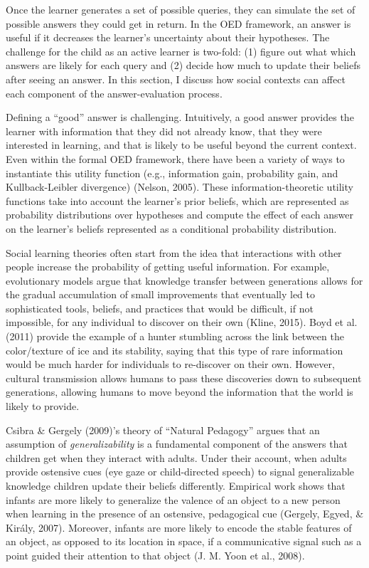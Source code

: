 \documentclass[oneside]{report}
\begin{document}
Once the learner generates a set of possible queries, they can simulate
the set of possible answers they could get in return. In the OED
framework, an answer is useful if it decreases the learner's uncertainty
about their hypotheses. The challenge for the child as an active learner
is two-fold: (1) figure out what which answers are likely for each query
and (2) decide how much to update their beliefs after seeing an answer.
In this section, I discuss how social contexts can affect each component
of the answer-evaluation process.

Defining a ``good'' answer is challenging. Intuitively, a good answer
provides the learner with information that they did not already know,
that they were interested in learning, and that is likely to be useful
beyond the current context. Even within the formal OED framework, there
have been a variety of ways to instantiate this utility function (e.g.,
information gain, probability gain, and Kullback-Leibler divergence)
(Nelson, 2005). These information-theoretic utility functions take into
account the learner's prior beliefs, which are represented as
probability distributions over hypotheses and compute the effect of each
answer on the learner's beliefs represented as a conditional probability
distribution.

Social learning theories often start from the idea that interactions
with other people increase the probability of getting useful
information. For example, evolutionary models argue that knowledge
transfer between generations allows for the gradual accumulation of
small improvements that eventually led to sophisticated tools, beliefs,
and practices that would be difficult, if not impossible, for any
individual to discover on their own (Kline, 2015). Boyd et al. (2011)
provide the example of a hunter stumbling across the link between the
color/texture of ice and its stability, saying that this type of rare
information would be much harder for individuals to re-discover on their
own. However, cultural transmission allows humans to pass these
discoveries down to subsequent generations, allowing humans to move
beyond the information that the world is likely to provide.

Csibra \& Gergely (2009)'s theory of ``Natural Pedagogy'' argues that an
assumption of \emph{generalizability} is a fundamental component of the
answers that children get when they interact with adults. Under their
account, when adults provide ostensive cues (eye gaze or child-directed
speech) to signal generalizable knowledge children update their beliefs
differently. Empirical work shows that infants are more likely to
generalize the valence of an object to a new person when learning in the
presence of an ostensive, pedagogical cue (Gergely, Egyed, \& Király,
2007). Moreover, infants are more likely to encode the stable features
of an object, as opposed to its location in space, if a communicative
signal such as a point guided their attention to that object (J. M. Yoon
et al., 2008).
\end{document}
